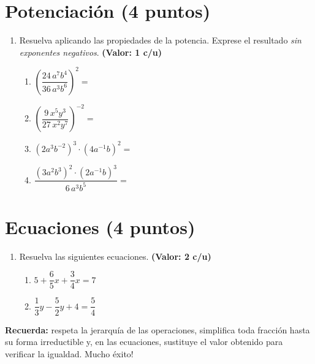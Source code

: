 \documentclass[12pt, letterpaper]{article}
\begin{document}
\newpage

\section{Potenciación (4 puntos)}

\begin{enumerate}[leftmargin=*, resume]

  \item Resuelva aplicando las propiedades de la potencia. Exprese el resultado \emph{sin exponentes negativos}. \hfill \textbf{(Valor: 1 c/u)}
        \begin{enumerate}[label=\alph*), leftmargin=*]
          \item $\left(\dfrac{24\,a^7 b^4}{36\,a^3 b^6}\right)^{2} =$
          \item $\left(\dfrac{9\,x^5 y^3}{27\,x^2 y^7}\right)^{-2} =$
          \item $\left(2a^3 b^{-2}\right)^3 \cdot \left(4a^{-1} b\right)^{2} =$
          \item $\dfrac{\left(3a^2 b^3\right)^{2} \cdot \left(2a^{-1} b\right)^{3}}{6\,a^3 b^5} =$
        \end{enumerate}

\end{enumerate}

\section{Ecuaciones (4 puntos)}

\begin{enumerate}[leftmargin=*, resume]

  \item Resuelva las siguientes ecuaciones. \hfill \textbf{(Valor: 2 c/u)}
        \begin{enumerate}[label=\alph*), leftmargin=*]
          \item $5 + \dfrac{6}{5}x + \dfrac{3}{4}x = 7$
          \item $\dfrac{1}{3}y - \dfrac{5}{2}y + 4 = \dfrac{5}{4}$
        \end{enumerate}

\end{enumerate}

\vspace{10pt}
\begin{cuadroinfo}
  \small
  \textbf{Recuerda:} respeta la jerarquía de las operaciones, simplifica toda fracción hasta su forma irreductible y, en las ecuaciones, sustituye el valor obtenido para verificar la igualdad. \textquestiondown Mucho éxito!
\end{cuadroinfo}
\end{document}

